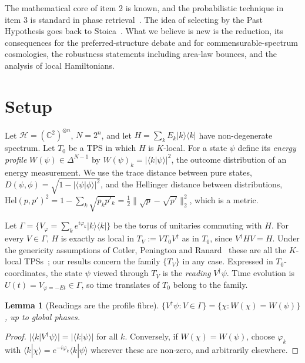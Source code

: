 \documentclass[11pt]{article}
\newtheorem{lemma}[theorem]{Lemma}
\theoremstyle{definition}
\theoremstyle{remark}
\newcommand{\ket}[1]{|#1\rangle}
\newcommand{\bra}[1]{\langle #1|}
\newcommand{\braket}[2]{\langle #1|#2\rangle}
\newcommand{\Hel}{\mathrm{Hel}}
\begin{document}
The mathematical core of item 2 is known, and the probabilistic technique in item 3 is standard in phase retrieval~\cite{BCE2006,ABDE2025}. The idea of selecting by the Past Hypothesis goes back to Stoica~\cite[Sec.~VII.B]{Stoica2022}. What we believe is new is the reduction, its consequences for the preferred-structure debate and for commensurable-spectrum cosmologies, the robustness statements including area-law bounces, and the analysis of local Hamiltonians.

\section{Setup}
\label{sec:setup}

Let $\mathcal{H}=(\mathbb{C}^2)^{\otimes n}$, $N=2^n$, and let $H=\sum_k E_k\ket{k}\bra{k}$ have non-degenerate spectrum. Let $T_0$ be a TPS in which $H$ is $K$-local. For a state $\psi$ define its \emph{energy profile} $W(\psi)\in\Delta^{N-1}$ by $W(\psi)_k=|\braket{k}{\psi}|^2$, the outcome distribution of an energy measurement. We use the trace distance between pure states, $D(\psi,\phi)=\sqrt{1-|\braket{\psi}{\phi}|^2}$, and the Hellinger distance between distributions, $\Hel(p,p')^2=1-\sum_k\sqrt{p_kp'_k}=\tfrac12\|\sqrt p-\sqrt{p'}\|_2^2$, which is a metric.

Let $\Gamma=\{V_\varphi=\sum_k e^{i\varphi_k}\ket{k}\bra{k}\}$ be the torus of unitaries commuting with $H$. For every $V\in\Gamma$, $H$ is exactly as local in $T_V:=VT_0V^\dagger$ as in $T_0$, since $V^\dagger HV=H$. Under the genericity assumptions of Cotler, Penington and Ranard~\cite{CPR2019} these are all the $K$-local TPSs~\cite{Soulas2025}; our results concern the family $\{T_V\}$ in any case. Expressed in $T_0$-coordinates, the state $\psi$ viewed through $T_V$ is the \emph{reading} $V^\dagger\psi$. Time evolution is $U(t)=V_{\varphi=-Et}\in\Gamma$, so time translates of $T_0$ belong to the family.

\begin{lemma}[Readings are the profile fibre]\label{lem:fibre}
$\{V^\dagger\psi:V\in\Gamma\}=\{\chi:W(\chi)=W(\psi)\}$, up to global phases.
\end{lemma}
\begin{proof}
$|\braket{k}{V^\dagger\psi}|=|\braket{k}{\psi}|$ for all $k$. Conversely, if $W(\chi)=W(\psi)$, choose $\varphi_k$ with $\braket{k}{\chi}=e^{-i\varphi_k}\braket{k}{\psi}$ wherever these are non-zero, and arbitrarily elsewhere.
\end{proof}
\end{document}
